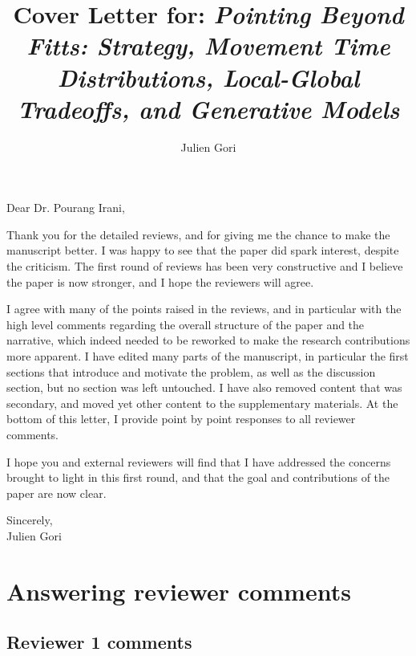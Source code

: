 \documentclass{article}
\title{Cover Letter for: \textit{Pointing Beyond Fitts: Strategy, Movement Time Distributions, Local-Global Tradeoffs, and Generative Models}}
\author{Julien Gori}
\begin{document}
\maketitle


Dear Dr. Pourang Irani,

\vspace{2\baselineskip}

Thank you for the detailed reviews, and for giving me the chance to make the manuscript better. I was happy to see that the paper did spark interest, despite the criticism. The first round of reviews has been very constructive and I believe the paper is now stronger, and I hope the reviewers will agree.

\vspace{\baselineskip}

I agree with many of the points raised in the reviews, and in particular with the high level comments regarding the overall structure of the paper and the narrative, which indeed needed to be reworked to make the research contributions more apparent.
I have edited many parts of the manuscript, in particular the first sections that introduce and motivate the problem, as well as the discussion section, but no section was left untouched. I have also removed content that was secondary, and moved yet other content to the supplementary materials. At the bottom of this letter, I provide point by point responses to all reviewer comments.

I hope you and external reviewers will find that I have addressed the concerns brought to light in this first round, and that the goal and contributions of the paper are now clear. 

\begin{flushright}
Sincerely,\\
Julien Gori
\end{flushright}



\section*{Answering reviewer comments}

\subsection*{Reviewer 1 comments}
\end{document}
